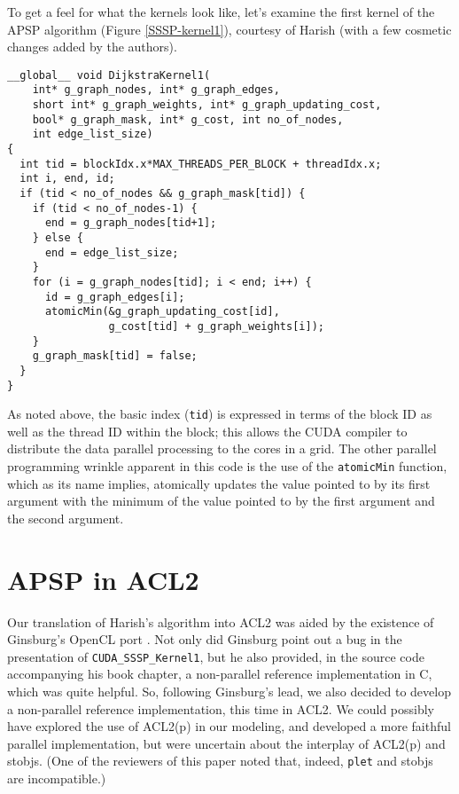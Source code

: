 \documentclass[copyright]{eptcs}
\begin{document}
To get a feel for what the kernels look like, let's examine the
first kernel of the APSP algorithm  (Figure \ref{SSSP-kernel1}),
courtesy of Harish \cite{HarishWeb} (with a few cosmetic changes 
added by the authors).

\begin{figure*}
\begin{verbatim}
__global__ void DijkstraKernel1(
    int* g_graph_nodes, int* g_graph_edges, 
    short int* g_graph_weights, int* g_graph_updating_cost, 
    bool* g_graph_mask, int* g_cost, int no_of_nodes, 
    int edge_list_size)
{
  int tid = blockIdx.x*MAX_THREADS_PER_BLOCK + threadIdx.x;
  int i, end, id;
  if (tid < no_of_nodes && g_graph_mask[tid]) {
    if (tid < no_of_nodes-1) {
      end = g_graph_nodes[tid+1];
    } else {
      end = edge_list_size;
    }
    for (i = g_graph_nodes[tid]; i < end; i++) {
      id = g_graph_edges[i];
      atomicMin(&g_graph_updating_cost[id], 
                g_cost[tid] + g_graph_weights[i]);
    }
    g_graph_mask[tid] = false;
  }
}
\end{verbatim}
\hrulefill
\caption{A Single-Source Shortest Path Kernel in CUDA.}
\label{SSSP-kernel1}
\end{figure*}

As noted above, the basic index (\texttt{tid}) is expressed in terms of
the block ID as well as the thread ID within the block; this allows
the CUDA compiler to distribute the data parallel processing to the
cores in a grid.  The other parallel programming wrinkle apparent in
this code is the use of the \texttt{atomicMin} function, which as its
name implies, atomically updates the value pointed to by its first 
argument with the minimum of the value pointed to by the first
argument and the second argument.

\section{APSP in ACL2}

Our translation of Harish's algorithm into ACL2 was aided by the
existence of Ginsburg's OpenCL port \cite{Ginsburg2011}.  Not only did 
Ginsburg point out a bug in the presentation of
\texttt{CUDA\_SSSP\_Kernel1}, but he also provided, in the source code 
accompanying his book chapter, a non-parallel reference implementation 
in C, which was quite helpful.  So, following
Ginsburg's lead, we also decided to develop a non-parallel reference 
implementation, this time in ACL2.  We could possibly have explored 
the use of ACL2(p) \cite{ACL2p} in our modeling, and developed a more 
faithful parallel implementation, but were uncertain about the interplay
of ACL2(p) and stobjs.  (One of the reviewers of this paper noted that, indeed,
\texttt{plet} and stobjs are incompatible.)
\end{document}
